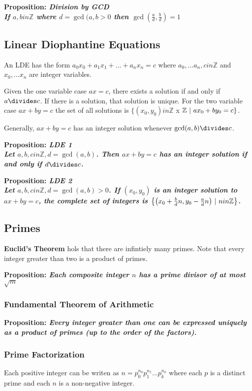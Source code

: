 \documentclass[12pt]{article}
\newcommand{\proposition}[1]{{\bf Proposition: \textit{#1}}}
\begin{document}
\proposition{Division by GCD\\
If $a,b in \mathbb{Z}$ where $d = \gcd(a,b > 0$ then $\gcd(\frac{a}{d},\frac{b}{d}) = 1$}

\subsection*{Linear Diophantine Equations}
 An LDE has the form $a_0x_0 + a_1x_1 + ... + a_nx_n = c$ where $a_0, ... a_n, c in \mathbb{Z}$ and $x_0, ... x_n$ are integer variables.

Given the one variable case $ax = c$, there exists a solution if and only if $a \divides c$. If there is a solution, that solution is unique. For the two variable case $ax + by = c$ the set of all solutions is $\{ (x_0, y_0) in \mathbb{Z}$ x $\mathbb{Z} \ |\  ax_0 + by_0 = c \}$.

Generally, $ax + by = c$ has an integer solution whenever $\gcd(a,b) \divides c$.

\proposition{LDE 1\\
Let $a,b,c in \mathbb{Z}, d = \gcd(a,b)$. Then $ax + by = c$ has an integer solution if and only if $d \divides c$.}

\proposition{LDE 2\\
Let $a,b,c in \mathbb{Z}, d = \gcd(a,b) > 0$. If $(x_0, y_0)$ is an integer solution to $ax + by = c$, the complete set of integers is $\bigl\{ \bigl( x_0 + \frac{b}{d}n, y_0 - \frac{a}{d}n \bigl) \ |\  n in \mathbb{Z} \bigl\}$.}

\subsection*{Primes}
{\bf Euclid's Theorem} hols that there are infintiely many primes. Note that every integer greater than two is a product of primes.

\proposition{Each composite integer $n$ has a prime divisor of at most $\sqrt{m}$}

\subsubsection*{Fundamental Theorem of Arithmetic}
\proposition{Every integer greater than one can be expressed uniquely as a product of primes (up to the order of the factors).}

\subsubsection*{Prime Factorization}
Each positive integer can be writen as $n = p_0^{n_0} p_1^{n_1} ... p_k^{n_k}$ where each $p$ is a distinct prime and each $n$ is a non-negative integer.
\end{document}

